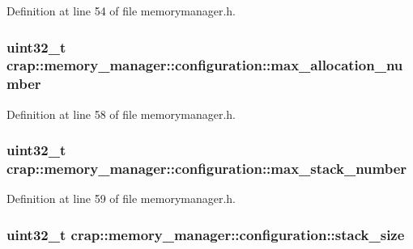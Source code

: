 Definition at line 54 of file memorymanager.\+h.

\hypertarget{structcrap_1_1memory__manager_1_1configuration_a793bafe39295d86d3dda7b2406678ee2}{}
\subsubsection[{max\+\_\+allocation\+\_\+number}]{\setlength{\rightskip}{0pt plus 5cm}uint32\+\_\+t crap\+::memory\+\_\+manager\+::configuration\+::max\+\_\+allocation\+\_\+number}\label{structcrap_1_1memory__manager_1_1configuration_a793bafe39295d86d3dda7b2406678ee2}


Definition at line 58 of file memorymanager.\+h.

\hypertarget{structcrap_1_1memory__manager_1_1configuration_ae29f9aa318e67c99b5a8a008b9971fcd}{}
\subsubsection[{max\+\_\+stack\+\_\+number}]{\setlength{\rightskip}{0pt plus 5cm}uint32\+\_\+t crap\+::memory\+\_\+manager\+::configuration\+::max\+\_\+stack\+\_\+number}\label{structcrap_1_1memory__manager_1_1configuration_ae29f9aa318e67c99b5a8a008b9971fcd}


Definition at line 59 of file memorymanager.\+h.

\hypertarget{structcrap_1_1memory__manager_1_1configuration_ab2398e2eef2484e19c711e4a5afade26}{}
\subsubsection[{stack\+\_\+size}]{\setlength{\rightskip}{0pt plus 5cm}uint32\+\_\+t crap\+::memory\+\_\+manager\+::configuration\+::stack\+\_\+size}\label{structcrap_1_1memory__manager_1_1configuration_ab2398e2eef2484e19c711e4a5afade26}


